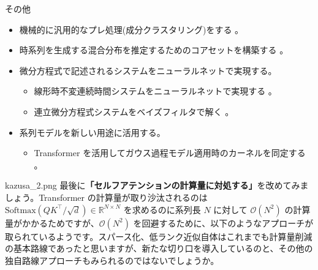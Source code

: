 \documentclass[b5paper,xelatex,ja=standard,10pt]{bxjsarticle}
\begin{document}
\vspace{1pt}
\begin{PROP}[colback=White, left=0pt]{その他}
\begin{itemize}
  \item 機械的に汎用的なプレ処理(成分クラスタリング)をする \cite{ZhiboZhu2021}。
  \item 時系列を生成する混合分布を推定するためのコアセットを構築する \cite{LingxiaoHuang2021}。
  \item 微分方程式で記述されるシステムをニューラルネットで実現する。
  \begin{itemize}
    \item 線形時不変連続時間システムをニューラルネットで実現する \cite{AlbertGu2021}。
    \item 連立微分方程式システムをベイズフィルタで解く \cite{JonathanSchmidt2021}。
  \end{itemize}
  \item 系列モデルを新しい用途に活用する。
  \begin{itemize}
    \item Transformer を活用してガウス過程モデル適用時のカーネルを同定する \cite{FergusSimpson2021}。
  \end{itemize}
\end{itemize}
\end{PROP}
\vspace{1pt}

\begin{SERIFU}[colback=PaleIris, colbacktitle=PaleIris2]{kazusa_2.png}
最後に\textbf{「セルフアテンションの計算量に対処する」}を改めてみましょう。Transformer の計算量が取り沙汰されるのは $\mathrm{Softmax} \left( Q K ^\top / \sqrt{d} \right) \in \mathbb{R}^{N \times N}$ を求めるのに系列長 $N$ に対して $\mathcal{O}(N^2)$ の計算量がかかるためですが、$\mathcal{O}(N^2)$ を回避するために、以下のようなアプローチが取られているようです。スパース化、低ランク近似自体はこれまでも計算量削減の基本路線であったと思いますが、新たな切り口を導入しているのと、その他の独自路線アプローチもみられるのではないでしょうか。
\end{SERIFU}
\end{document}
